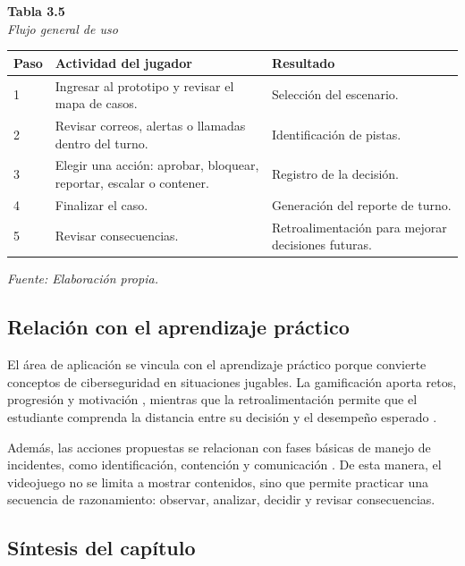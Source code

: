 \begin{center}
\textbf{Tabla 3.5}\\
\textit{Flujo general de uso}

\vspace{0.2cm}
\begin{tabular}{|p{}|p{}|p{}|}
\hline
\textbf{Paso} & \textbf{Actividad del jugador} & \textbf{Resultado} \\
\hline
1 & Ingresar al prototipo y revisar el mapa de casos. & Selecci\'{o}n del escenario. \\
\hline
2 & Revisar correos, alertas o llamadas dentro del turno. & Identificaci\'{o}n de pistas. \\
\hline
3 & Elegir una acci\'{o}n: aprobar, bloquear, reportar, escalar o contener. & Registro de la decisi\'{o}n. \\
\hline
4 & Finalizar el caso. & Generaci\'{o}n del reporte de turno. \\
\hline
5 & Revisar consecuencias. & Retroalimentaci\'{o}n para mejorar decisiones futuras. \\
\hline
\end{tabular}

\textit{Fuente: Elaboraci\'{o}n propia.}
\end{center}

\subsection{Relaci\'{o}n con el aprendizaje pr\'{a}ctico}

El \'{a}rea de aplicaci\'{o}n se vincula con el aprendizaje pr\'{a}ctico porque convierte conceptos de ciberseguridad en situaciones jugables. La gamificaci\'{o}n aporta retos, progresi\'{o}n y motivaci\'{o}n \parencite{kapp2012gamification}, mientras que la retroalimentaci\'{o}n permite que el estudiante comprenda la distancia entre su decisi\'{o}n y el desempe\~{n}o esperado \parencite{hattie2007feedback}.

Adem\'{a}s, las acciones propuestas se relacionan con fases b\'{a}sicas de manejo de incidentes, como identificaci\'{o}n, contenci\'{o}n y comunicaci\'{o}n \parencite{cichonski2022incident}. De esta manera, el videojuego no se limita a mostrar contenidos, sino que permite practicar una secuencia de razonamiento: observar, analizar, decidir y revisar consecuencias.

\subsection{S\'{i}ntesis del cap\'{i}tulo}

